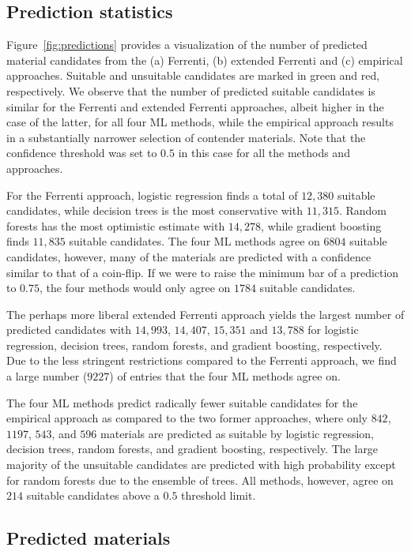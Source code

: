 \documentclass[superscriptaddress,unsortedaddress,
 amsmath,amssymb,
 aps,
]{revtex4-2}
\begin{document}
\subsection*{Prediction statistics}

Figure~\ref{fig:predictions} provides a visualization of the number of predicted material candidates from the (a) Ferrenti, (b) extended Ferrenti and (c) empirical approaches. Suitable and unsuitable candidates are marked in green and red, respectively. We observe that the number of predicted suitable candidates is similar for the Ferrenti and extended Ferrenti approaches, albeit higher in the case of the latter, for all four ML methods, while the empirical approach results in a substantially narrower selection of contender materials.
Note that the confidence threshold was set to $0.5$ in this case for all the methods and approaches. 

For the Ferrenti approach, logistic regression finds a total of $12,380$ suitable candidates, while decision trees is the most conservative with $11,315$. Random forests has the most optimistic estimate with $14,278$, while gradient boosting finds $11,835$ suitable candidates. The four ML methods agree on $6804$ suitable candidates,  however, many of the materials are predicted with a confidence similar to that of a coin-flip.
If we were to raise the minimum bar of a prediction to $0.75$, the four methods would only agree on $1784$ suitable candidates. 

The perhaps more liberal extended Ferrenti approach yields the largest number of predicted candidates with $14,993$, $14,407$, $15,351$ and $13,788$ for logistic regression, decision trees, random forests, and gradient boosting, respectively. Due to the less stringent restrictions compared to the Ferrenti approach, we find a large number ($9227$) of entries that the four ML methods  agree on.

The four ML methods predict radically fewer suitable candidates for the empirical approach as compared to the two former approaches, where only $842$, $1197$, $543$, and $596$ materials are predicted as suitable by logistic regression, decision trees, random forests, and gradient boosting, respectively. The large majority of the unsuitable candidates are predicted with high probability except for random forests due to the ensemble of trees. All methods, however, agree on $214$ suitable candidates above a $0.5$ threshold limit.  

\subsection*{Predicted materials}
\end{document}
